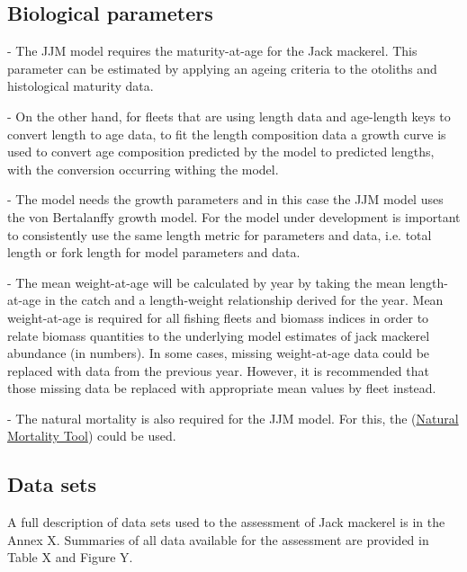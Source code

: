 \documentclass{article}
\begin{document}
\subsection{Biological parameters}

- The JJM model requires the maturity-at-age for the Jack mackerel. This parameter can be estimated by applying an ageing criteria to the otoliths and histological maturity data.

- On the other hand, for fleets that are using length data and age-length keys to convert length to age data, to fit the length composition data a growth curve is used to convert age composition predicted by the model to predicted lengths, with the conversion occurring withing the model.

- The model needs the growth parameters and in this case the JJM model uses the von Bertalanffy growth model. For the model under development is important to consistently use the same length metric for parameters and data, i.e. total length or fork length for model parameters and data.

- The mean weight-at-age will be calculated by year by taking the mean length-at-age in the catch and a length-weight relationship derived for the year. Mean weight-at-age is required for all fishing fleets and biomass indices in order to relate biomass quantities to the underlying model estimates of jack mackerel abundance (in numbers). In some cases, missing weight-at-age data could be replaced with data from the previous year. However, it is recommended that those missing data be replaced with appropriate mean values by fleet instead. 

- The natural mortality is also required for the JJM model. For this, the (\href{https://connect.fisheries.noaa.gov/natural-mortality-tool/}{Natural Mortality Tool}) could be used. 

\subsection{Data sets}

A full description of data sets used to the assessment of Jack mackerel is in the Annex X. Summaries of all data available for the assessment are provided in Table X and Figure Y.
\end{document}
